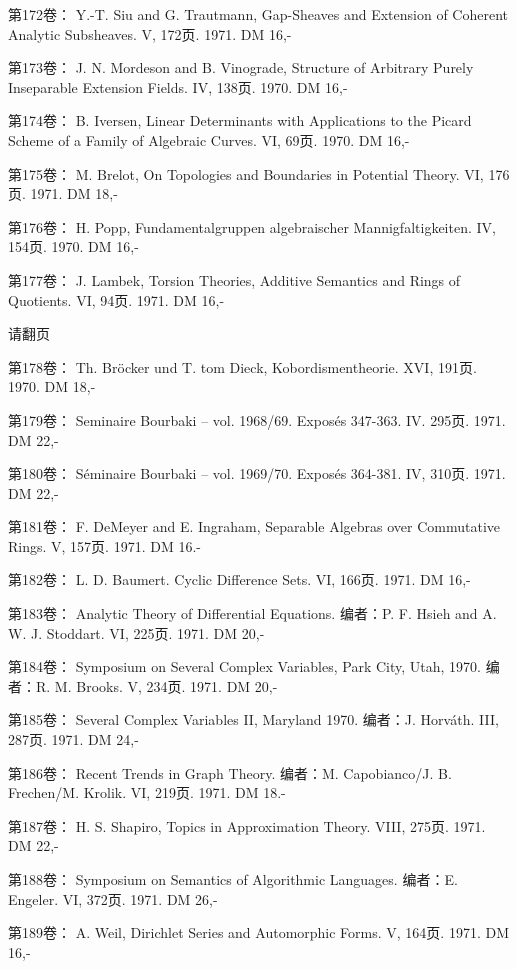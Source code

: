 第172卷： Y.-T. Siu and G. Trautmann, Gap-Sheaves and Extension of Coherent Analytic Subsheaves. V, 172页. 1971. DM 16,-

第173卷： J. N. Mordeson and B. Vinograde, Structure of Arbitrary Purely Inseparable Extension Fields. IV, 138页. 1970. DM 16,-

第174卷： B. Iversen, Linear Determinants with Applications to the Picard Scheme of a Family of Algebraic Curves. VI, 69页. 1970. DM 16,-

第175卷： M. Brelot, On Topologies and Boundaries in Potential Theory. VI, 176页. 1971. DM 18,-

第176卷： H. Popp, Fundamentalgruppen algebraischer Mannigfaltigkeiten. IV, 154页. 1970. DM 16,-

第177卷： J. Lambek, Torsion Theories, Additive Semantics and Rings of Quotients. VI, 94页. 1971. DM 16,-

请翻页



第178卷： Th. Bröcker und T. tom Dieck, Kobordismentheorie. XVI, 191页. 1970. DM 18,-

第179卷： Seminaire Bourbaki -- vol. 1968/69. Exposés 347-363. IV. 295页. 1971. DM 22,-

第180卷： Séminaire Bourbaki -- vol. 1969/70. Exposés 364-381. IV, 310页. 1971. DM 22,-

第181卷： F. DeMeyer and E. Ingraham, Separable Algebras over Commutative Rings. V, 157页. 1971. DM 16.-

第182卷： L. D. Baumert. Cyclic Difference Sets. VI, 166页. 1971. DM 16,-

第183卷： Analytic Theory of Differential Equations. 编者：P. F. Hsieh and A. W. J. Stoddart. VI, 225页. 1971. DM 20,-

第184卷： Symposium on Several Complex Variables, Park City, Utah, 1970. 编者：R. M. Brooks. V, 234页. 1971. DM 20,-

第185卷： Several Complex Variables II, Maryland 1970. 编者：J. Horváth. III, 287页. 1971. DM 24,-

第186卷： Recent Trends in Graph Theory. 编者：M. Capobianco/J. B. Frechen/M. Krolik. VI, 219页. 1971. DM 18.-

第187卷： H. S. Shapiro, Topics in Approximation Theory. VIII, 275页. 1971. DM 22,-

第188卷： Symposium on Semantics of Algorithmic Languages. 编者：E. Engeler. VI, 372页. 1971. DM 26,-

第189卷： A. Weil, Dirichlet Series and Automorphic Forms. V, 164页. 1971. DM 16,-

